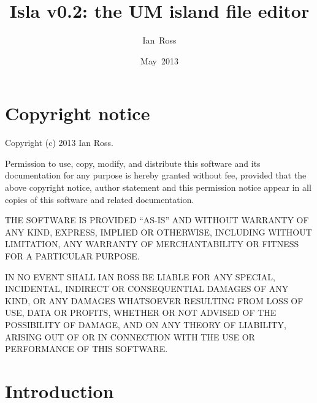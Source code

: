 \documentclass[11pt,makeidx,texhelp]{report}
\title{Isla v0.2: the UM island file editor}
\author{Ian~Ross}
\date{May~2013}
\begin{document}
\maketitle

\tableofcontents

\chapter*{Copyright notice}

Copyright (c) 2013 Ian Ross.

Permission to use, copy, modify, and distribute this software and its
documentation for any purpose is hereby granted without fee, provided that the
above copyright notice, author statement and this permission notice appear in
all copies of this software and related documentation.

THE SOFTWARE IS PROVIDED ``AS-IS'' AND WITHOUT WARRANTY OF ANY KIND, EXPRESS,
IMPLIED OR OTHERWISE, INCLUDING WITHOUT LIMITATION, ANY WARRANTY OF
MERCHANTABILITY OR FITNESS FOR A PARTICULAR PURPOSE.

IN NO EVENT SHALL IAN ROSS BE LIABLE FOR ANY SPECIAL, INCIDENTAL,
INDIRECT OR CONSEQUENTIAL DAMAGES OF ANY KIND, OR ANY DAMAGES
WHATSOEVER RESULTING FROM LOSS OF USE, DATA OR PROFITS, WHETHER OR NOT
ADVISED OF THE POSSIBILITY OF DAMAGE, AND ON ANY THEORY OF LIABILITY,
ARISING OUT OF OR IN CONNECTION WITH THE USE OR PERFORMANCE OF THIS
SOFTWARE.

\chapter{Introduction}
\end{document}

